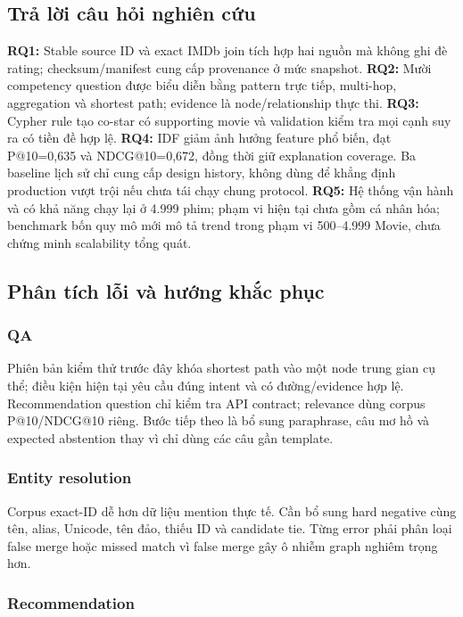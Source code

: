 \subsection{Trả lời câu hỏi nghiên cứu}

\textbf{RQ1:} Stable source ID và exact IMDb join tích hợp hai nguồn mà không ghi đè
rating; checksum/manifest cung cấp provenance ở mức snapshot.
\textbf{RQ2:} Mười competency question được biểu diễn bằng pattern trực tiếp, multi-hop,
aggregation và shortest path; evidence là node/relationship thực thi.
\textbf{RQ3:} Cypher rule tạo co-star có supporting movie và validation kiểm tra mọi cạnh suy ra có tiền đề hợp lệ.
\textbf{RQ4:} IDF giảm ảnh hưởng feature phổ biến, đạt P@10=0,635 và NDCG@10=0,672,
đồng thời giữ explanation coverage. Ba baseline lịch sử chỉ cung cấp design
history, không dùng để khẳng định production vượt trội nếu chưa tái chạy chung protocol.
\textbf{RQ5:} Hệ thống vận hành và có khả năng chạy lại ở 4.999 phim; phạm vi
hiện tại chưa gồm cá nhân hóa; benchmark bốn quy mô mới mô tả trend trong phạm vi
500–4.999 Movie, chưa chứng minh scalability tổng quát.

\subsection{Phân tích lỗi và hướng khắc phục}

\subsubsection{QA}

Phiên bản kiểm thử trước đây khóa shortest path vào một node trung gian cụ thể;
điều kiện hiện tại yêu cầu đúng intent và có đường/evidence hợp lệ.
Recommendation question chỉ kiểm tra API
contract; relevance dùng corpus P@10/NDCG@10 riêng. Bước tiếp theo là bổ sung
paraphrase, câu mơ hồ và expected abstention thay vì chỉ dùng các câu gần template.

\subsubsection{Entity resolution}

Corpus exact-ID dễ hơn dữ liệu mention thực tế. Cần bổ sung hard negative cùng tên,
alias, Unicode, tên đảo, thiếu ID và candidate tie. Từng error phải phân loại false
merge hoặc missed match vì false merge gây ô nhiễm graph nghiêm trọng hơn.

\subsubsection{Recommendation}

